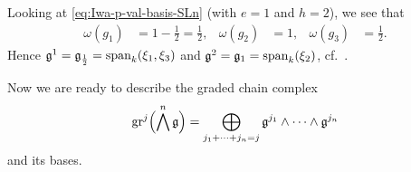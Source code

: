 Looking at \eqref{eq:Iwa-p-val-basis-SLn} (with $e=1$ and $h=2$), we see that
\begin{align*}
  \omega(g_{1}) &= 1-\frac{1}{2} = \frac{1}{2}, & \omega(g_{2}) &= 1, & \omega(g_{3}) &= \frac{1}{2}.
\end{align*}
Hence $\mathfrak{g}^{1} = \mathfrak{g}_{\frac{1}{2}} = \operatorname{span}_{k}(\xi_{1},\xi_{3})$ and $\mathfrak{g}^{2} = \mathfrak{g}_{1} = \operatorname{span}_{k}(\xi_{2})$, cf.\ .


Now we are ready to describe the graded chain complex
\begin{equation*}
  \operatorname{gr}^{j}\Bigl( \bigwedge^{n}\mathfrak{g} \Bigr) = \bigoplus_{j_{1} + \dotsb + j_{n} = j} \mathfrak{g}^{j_{1}} \wedge \dotsb \wedge \mathfrak{g}^{j_{n}}
\end{equation*}
and its bases.

